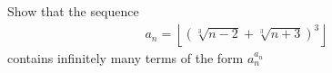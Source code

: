 Show that the sequence
\begin{align*} a_n = \left \lfloor \left( \sqrt[3]{n-2} + \sqrt[3]{n+3} \right)^3 \right \rfloor \end{align*}contains infinitely many terms of the form $a_n^{a_n}$